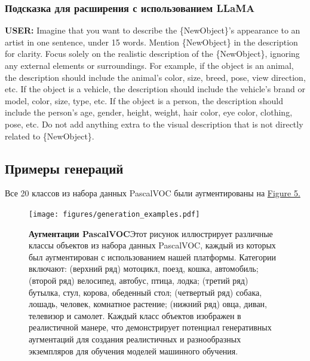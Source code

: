 \documentclass[11pt]{article}
\begin{document}
\subsubsection{Подсказка для расширения с использованием LLaMA}

\begin{tcolorbox}[
  colback=lightgray, %
  boxrule=1pt, %
]\textbf{USER:} Imagine that you want to describe the \{NewObject\}'s appearance to an artist in one sentence, under 15 words. Mention \{NewObject\} in the description for clarity. Focus solely on the realistic description of the \{NewObject\}, ignoring any external elements or surroundings.
For example, if the object is an animal, the description should include the animal's color, size, breed, pose, view direction, etc. If the object is a vehicle, the description should include the vehicle's brand or model, color, size, type, etc. If the object is a person, the description should include the person's age, gender, height, weight, hair color, eye color, clothing, pose, etc.
Do not add anything extra to the visual description that is not directly related to \{NewObject\}.\\
\end{tcolorbox}


\subsection{Примеры генераций} Все 20 классов из набора данных PascalVOC были аугментированы на  \hyperref[fig:generation_examples]{Figure 5.}


\begin{figure}[h]
    \centering
    \texttt{[image: figures/generation\_examples.pdf]}
    \caption{\textbf{Аугментации PascalVOC}Этот рисунок иллюстрирует различные классы объектов из набора данных PascalVOC, каждый из которых был аугментирован с использованием нашей платформы. Категории включают: (верхний ряд) мотоцикл, поезд, кошка, автомобиль; (второй ряд) велосипед, автобус, птица, лодка; (третий ряд) бутылка, стул, корова, обеденный стол; (четвертый ряд) собака, лошадь, человек, комнатное растение; (нижний ряд) овца, диван, телевизор и самолет. Каждый класс объектов изображен в реалистичной манере, что демонстрирует потенциал генеративных аугментаций для создания реалистичных и разнообразных экземпляров для обучения моделей машинного обучения.}
    \label{fig:generation_examples}
\end{figure}
\end{document}
